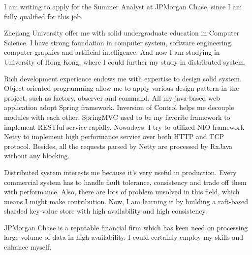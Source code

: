\documentclass[11pt, a4paper]{awesome-cv} %
\begin{document}
\makecvheader %

\makelettertitle %


I am writing to apply for the Summer Analyst at JPMorgan Chase, since I am fully qualified for this job.

Zhejiang University offer me with solid undergraduate education in Computer Science. I have strong foundation
in computer system, software engineering, computer graphics and artificial intelligence. And now I am studying
in University of Hong Kong, where I could further my study in distributed system.

Rich development experience endows me with expertise to design solid system. Object oriented programming 
allow me to apply various design pattern in the project, such as factory, observer and command. All my
java-based web application adopt Spring framework. Inversion of Control helps me decouple modules with
each other. SpringMVC used to be my favorite framework to implement RESTful service rapidly. Nowadays,
I try to utilized NIO framework Netty to implement high performance service over both HTTP and TCP
protocol. Besides, all the requests parsed by Netty are processed by RxJava without any blocking.

Distributed system interests me because it's very useful in production. Every commercial system has to handle fault 
tolerance, consistency and trade off them with performance. Also, there are lots of problem unsolved in 
this field, which means I might make contribution. Now, I am learning it by building a raft-based sharded key-value 
store with high availability and high consistency.

JPMorgan Chase is a reputable financial firm which has keen need on processing large volume of data in high availability. 
I could certainly employ my skills and enhance myself.

\begin{cvletter}





\end{cvletter}


\makeletterclosing %
\end{document}
